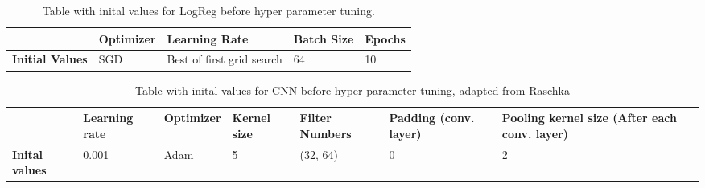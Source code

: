 \begin{table}[H]
 \centering
    \caption{Table with inital values for LogReg before hyper parameter tuning.}
\begin{tabular}{|l|l|l|l|l|}
\hline
                        & \textbf{Optimizer} & \textbf{Learning Rate}    & \textbf{Batch Size} & \textbf{Epochs} \\ \hline
\textbf{Initial Values} & SGD                & Best of first grid search & 64                  & 10              \\ \hline
\end{tabular}
\label{tb:loginitial}
\end{table}

\begin{table}[H]
    \centering
    \caption{Table with inital values for CNN before hyper parameter tuning, adapted from Raschka \cite{raschka2022machine}}
    
\begin{tabular}{|p{2.5cm}|p{2cm}|l|p{1.5cm}|p{2cm}|p{2.5cm}|p{3cm}|}
\hline
                       &\textbf{Learning rate} &  \textbf{Optimizer} & \textbf{Kernel size} & \textbf{Filter Numbers}& \textbf{Padding} (conv. layer) & \textbf{Pooling kernel size} (After each conv. layer) \\ \hline
\textbf{Inital values}                 & 0.001                  & Adam               & 5                    & (32, 64)     & 0
            & 2\\ \hline
\end{tabular}
\label{tb:initialvalues}
\end{table}

